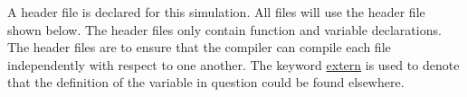 A header file is declared for this simulation. All files will use the header file shown below. The header files only contain function and variable declarations. The header files are to ensure that the compiler can compile each file independently with respect to one another. The keyword \url{extern} is used to denote that the definition of the variable in question could be found elsewhere.
